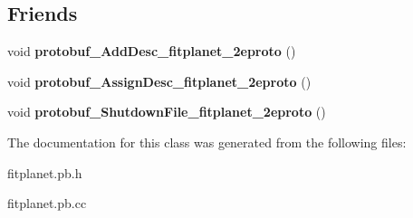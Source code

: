 \subsection*{Friends}
\begin{DoxyCompactItemize}
\item 
\hypertarget{classmachines_1_1Machines_a8630324413f042411acb26cd21efd53e}{void {\bfseries protobuf\-\_\-\-Add\-Desc\-\_\-fitplanet\-\_\-2eproto} ()}\label{classmachines_1_1Machines_a8630324413f042411acb26cd21efd53e}

\item 
\hypertarget{classmachines_1_1Machines_a005300ae4e9313c5f2d6ed15f4f18d7f}{void {\bfseries protobuf\-\_\-\-Assign\-Desc\-\_\-fitplanet\-\_\-2eproto} ()}\label{classmachines_1_1Machines_a005300ae4e9313c5f2d6ed15f4f18d7f}

\item 
\hypertarget{classmachines_1_1Machines_a3942eb78a8614c8d9d4994d09c14849d}{void {\bfseries protobuf\-\_\-\-Shutdown\-File\-\_\-fitplanet\-\_\-2eproto} ()}\label{classmachines_1_1Machines_a3942eb78a8614c8d9d4994d09c14849d}

\end{DoxyCompactItemize}


The documentation for this class was generated from the following files\-:\begin{DoxyCompactItemize}
\item 
fitplanet.\-pb.\-h\item 
fitplanet.\-pb.\-cc\end{DoxyCompactItemize}

